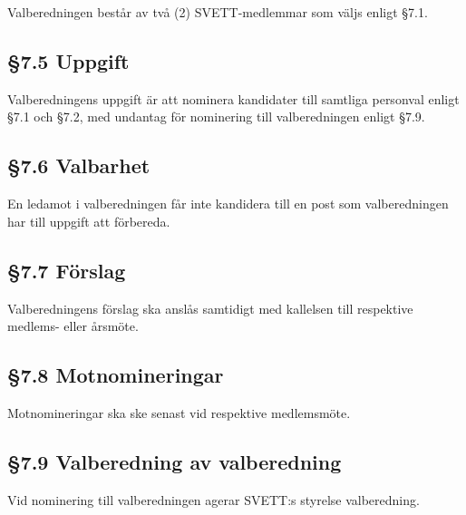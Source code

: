 Valberedningen består av två (2) SVETT-medlemmar som väljs enligt \S7.1.

\subsection*{\S7.5 Uppgift}

Valberedningens uppgift är att nominera kandidater till samtliga personval enligt
\S7.1 och \S7.2, med undantag för nominering till valberedningen enligt \S7.9.

\subsection*{\S7.6 Valbarhet}

En ledamot i valberedningen får inte kandidera till en post som valberedningen har
till uppgift att förbereda.

\subsection*{\S7.7 Förslag}

Valberedningens förslag ska anslås samtidigt med kallelsen till respektive medlems-
eller årsmöte.

\subsection*{\S7.8 Motnomineringar}

Motnomineringar ska ske senast vid respektive medlemsmöte.

\subsection*{\S7.9 Valberedning av valberedning}

Vid nominering till valberedningen agerar SVETT:s styrelse valberedning.
